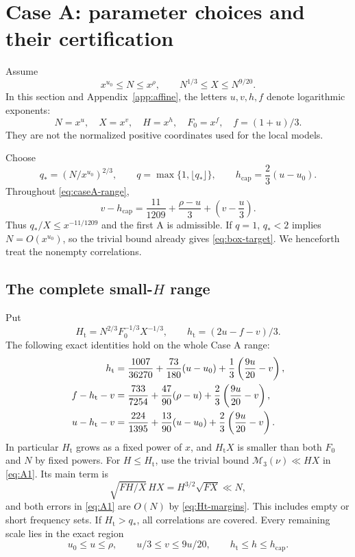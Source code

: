 \documentclass[11pt,a4paper]{article}
\numberwithin{equation}{section}
\theoremstyle{remark}
\newcommand{\hcap}{h_{\mathrm{cap}}}
\newcommand{\hthreshold}{h_{\mathrm t}}
\newcommand{\Fzero}{F_0}
\begin{document}
\section{Case A: parameter choices and their certification}
\label{sec:caseA}
Assume
\begin{equation}\label{eq:caseA-range}
 x^{u_0}\le N\le x^\rho,\qquad
 N^{1/3}\le X\le N^{9/20}.
\end{equation}
In this section and Appendix~\ref{app:affine}, the letters $u,v,h,f$
denote logarithmic exponents:
\[
 N=x^u,\quad X=x^v,\quad H=x^h,\quad
 \Fzero=x^f,\quad f=(1+u)/3.
\]
They are not the normalized positive coordinates used for the local models.

Choose
\begin{equation}\label{eq:first-q}
 q_*=(N/x^{u_0})^{2/3},\qquad
 q=\max\{1,\lfloor q_*\rfloor\},\qquad
 \hcap=\frac23(u-u_0).
\end{equation}
Throughout \eqref{eq:caseA-range},
\begin{equation}\label{eq:initial-cap-margin}
 v-\hcap=\frac{11}{1209}+\frac{\rho-u}{3}
                  +\left(v-\frac u3\right).
\end{equation}
Thus $q_*/X\le x^{-11/1209}$ and the first A is admissible. If $q=1$,
$q_*<2$ implies $N=O(x^{u_0})$, so the trivial bound already gives
\eqref{eq:box-target}. We henceforth treat the nonempty correlations.

\subsection{The complete small-\texorpdfstring{$H$}{H} range}
Put
\begin{equation}\label{eq:Ht}
 H_{\mathrm t}=N^{2/3}\Fzero^{-1/3}X^{-1/3},\qquad
 \hthreshold=(2u-f-v)/3.
\end{equation}
The following exact identities hold on the whole Case A range:
\begin{align}
 \hthreshold&=\frac{1007}{36270}+\frac{73}{180}(u-u_0)
                   +\frac13\left(\frac{9u}{20}-v\right),\notag\\
 f-\hthreshold-v&=\frac{733}{7254}+\frac{47}{90}(\rho-u)
                   +\frac23\left(\frac{9u}{20}-v\right),
                   \label{eq:Ht-margins}\\
 u-\hthreshold-v&=\frac{224}{1395}+\frac{13}{90}(u-u_0)
                   +\frac23\left(\frac{9u}{20}-v\right).\notag
\end{align}
In particular $H_{\mathrm t}$ grows as a fixed power of $x$, and
$H_{\mathrm t}X$ is smaller than both $\Fzero$ and $N$ by fixed powers.
For $H\le H_{\mathrm t}$, use the trivial bound
$\mathcal M_3(\nu)\ll HX$ in \eqref{eq:A1}. Its main term is
\[
 \sqrt{FH/X}\,HX=H^{3/2}\sqrt{FX}\ll N,
\]
and both errors in \eqref{eq:A1} are $O(N)$ by
\eqref{eq:Ht-margins}. This includes empty or short frequency sets. If
$H_{\mathrm t}>q_*$, all correlations are covered. Every remaining scale
lies in the exact region
\begin{equation}\label{eq:largeH-region}
 u_0\le u\le\rho,\qquad u/3\le v\le9u/20,
 \qquad \hthreshold\le h\le\hcap.
\end{equation}
\end{document}
